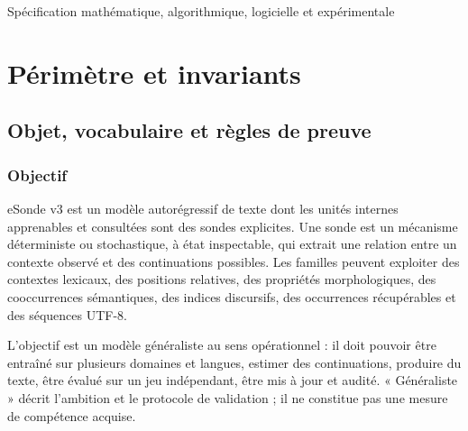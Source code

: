 \documentclass[11pt,a4paper,oneside,openany]{book}
\begin{document}
\frontmatter
\begin{titlepage}\centering\vspace*{2cm}{\Large FORMALISATION TECHNIQUE ET OPÉRATIONNELLE\par}\vspace{1cm}{\Huge\bfseries eSonde v3\par}\vspace{0.6cm}{\Large Modèle de langage généraliste à unités de calcul exclusivement fondées sur des sondes\par}\vspace{1.2cm}{\large Version 3.0 — 10 novembre 2026\par}\vfill{\large Spécification mathématique, algorithmique, logicielle et expérimentale\par}\vspace{1cm}{\small Contrat de conception : zéro neurone, zéro MLP, aucun embedding neuronal dense.\par}\end{titlepage}
\tableofcontents
\mainmatter

\part{Périmètre et invariants}
\chapter{Objet, vocabulaire et règles de preuve}
\section{Objectif}
eSonde v3 est un modèle autorégressif de texte dont les unités internes apprenables et consultées sont des sondes explicites. Une sonde est un mécanisme déterministe ou stochastique, à état inspectable, qui extrait une relation entre un contexte observé et des continuations possibles. Les familles peuvent exploiter des contextes lexicaux, des positions relatives, des propriétés morphologiques, des cooccurrences sémantiques, des indices discursifs, des occurrences récupérables et des séquences UTF-8.

L'objectif est un modèle généraliste au sens opérationnel : il doit pouvoir être entraîné sur plusieurs domaines et langues, estimer des continuations, produire du texte, être évalué sur un jeu indépendant, être mis à jour et audité. « Généraliste » décrit l'ambition et le protocole de validation ; il ne constitue pas une mesure de compétence acquise.
\end{document}
